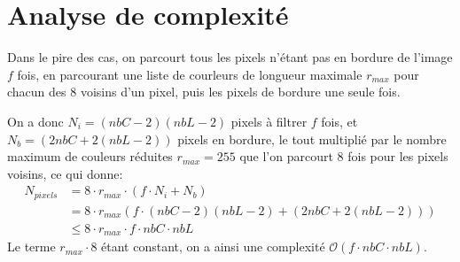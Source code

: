 \documentclass[a4paper, 11pt]{article}
\begin{document}
\section*{Analyse de complexité}
\begin{minipage}{0.5\linewidth}
Dans le pire des cas, on parcourt tous les pixels n'étant pas en bordure de l'image $f$ fois, en parcourant une liste de courleurs de longueur maximale $r_{max}$ pour chacun des 8 voisins d'un pixel, puis les pixels de bordure une seule fois.

On a donc $N_i = (nbC - 2)(nbL-2)$ pixels à filtrer $f$ fois, et $N_b = (2nbC + 2(nbL-2))$ pixels en bordure, le tout multiplié par le nombre maximum de couleurs réduites $r_{max} = 255$ que l'on parcourt 8 fois pour les pixels voisins, ce qui donne:
\begin{align}
N_{pixels} &= 8 \cdot r_{max} \cdot (f \cdot N_i + N_b ) \nonumber \\
&= 8 \cdot r_{max}  (f \cdot (nbC - 2)(nbL-2) + (2nbC + 2(nbL-2))) \nonumber \\
&\leq 8\cdot r_{max}\cdot f\cdot nbC\cdot nbL \nonumber
\end{align}
Le terme $r_{max}\cdot 8$ étant constant, on a ainsi une complexité $\mathcal{O}(f\cdot nbC\cdot nbL)$.
\end{minipage}\hfil
\end{document}
